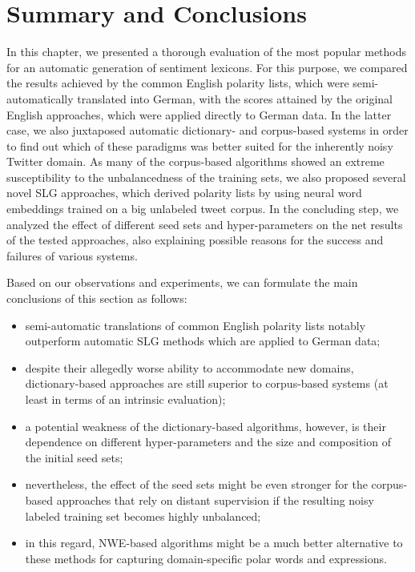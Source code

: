 \section{Summary and Conclusions}

In this chapter, we presented a thorough evaluation of the most
popular methods for an automatic generation of sentiment lexicons.
For this purpose, we compared the results achieved by the common
English polarity lists, which were semi-automatically translated into
German, with the scores attained by the original English approaches,
which were applied directly to German data.  In the latter case, we
also juxtaposed automatic dictionary- and corpus-based systems in
order to find out which of these paradigms was better suited for the
inherently noisy Twitter domain.  As many of the corpus-based
algorithms showed an extreme susceptibility to the unbalancedness of
the training sets, we also proposed several novel SLG approaches,
which derived polarity lists by using neural word embeddings trained
on a big unlabeled tweet corpus.  In the concluding step, we analyzed
the effect of different seed sets and hyper-parameters on the net
results of the tested approaches, also explaining possible reasons for
the success and failures of various systems.

Based on our observations and experiments, we can formulate the main
conclusions of this section as follows:
\begin{itemize}
\item semi-automatic translations of common English polarity lists
  notably outperform automatic SLG methods which are applied to German
  data;
\item despite their allegedly worse ability to accommodate new
  domains, dictionary-based approaches are still superior to
  corpus-based systems (at least in terms of an intrinsic evaluation);
\item a potential weakness of the dictionary-based algorithms,
  however, is their dependence on different hyper-parameters and the
  size and composition of the initial seed sets;
\item nevertheless, the effect of the seed sets might be even stronger
  for the corpus-based approaches that rely on distant supervision if
  the resulting noisy labeled training set becomes highly unbalanced;
\item in this regard, NWE-based algorithms might be a much better
  alternative to these methods for capturing domain-specific polar
  words and expressions.
\end{itemize}
